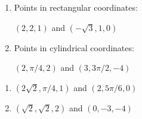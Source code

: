 {
\begin{enumerate}
	\item Points in rectangular coordinates:

$(2,2,1)$ and $(-\sqrt{3},1,0)$

	\item Points in cylindrical coordinates:
	
	$(2,\pi/4,2)$ and $(3,3\pi/2,-4)$
	

\end{enumerate}
}
{\begin{enumerate}
	\item $(2\sqrt 2,\pi/4,1)$ and $(2,5\pi/6,0)$
		
	\item $(\sqrt 2,\sqrt 2,2)$ and $(0,-3,-4)$
	
\end{enumerate}
}
